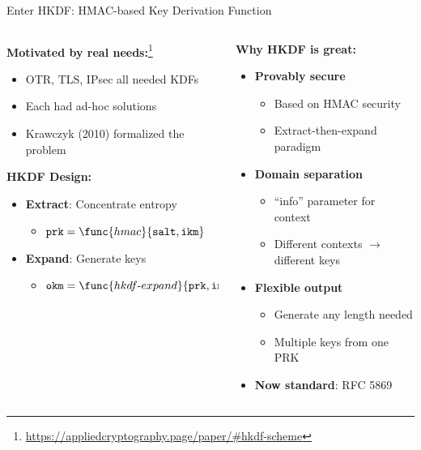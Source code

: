 \documentclass[aspectratio=169, lualatex, handout]{beamer}
\begin{document}
\begin{frame}{Enter HKDF: HMAC-based Key Derivation Function}
	\begin{columns}[c]
		\begin{column}{0.5\textwidth}
			\textbf{Motivated by real needs:}\footnote{\url{https://appliedcryptography.page/paper/\#hkdf-scheme}}
			\begin{itemize}
				\item OTR, TLS, IPsec all needed KDFs
				\item Each had ad-hoc solutions
				\item Krawczyk (2010) formalized the problem
			\end{itemize}
			\textbf{HKDF Design:}
			\begin{itemize}
				\item \textbf{Extract}: Concentrate entropy
				      \begin{itemize}
					      \item $\texttt{prk} = \func{hmac}{\texttt{salt}, \texttt{ikm}}$
				      \end{itemize}
				\item \textbf{Expand}: Generate keys
				      \begin{itemize}
					      \item $\texttt{okm} = \func{hkdf\text{-}expand}{\texttt{prk}, \texttt{info}, \texttt{len}}$
				      \end{itemize}
			\end{itemize}
		\end{column}
		\begin{column}{0.5\textwidth}
			\textbf{Why HKDF is great:}
			\begin{itemize}
				\item \textbf{Provably secure}
				      \begin{itemize}
					      \item Based on HMAC security
					      \item Extract-then-expand paradigm
				      \end{itemize}
				\item \textbf{Domain separation}
				      \begin{itemize}
					      \item ``info'' parameter for context
					      \item Different contexts $\rightarrow$ different keys
				      \end{itemize}
				\item \textbf{Flexible output}
				      \begin{itemize}
					      \item Generate any length needed
					      \item Multiple keys from one PRK
				      \end{itemize}
				\item \textbf{Now standard}: RFC 5869
			\end{itemize}
		\end{column}
	\end{columns}
\end{frame}
\end{document}
